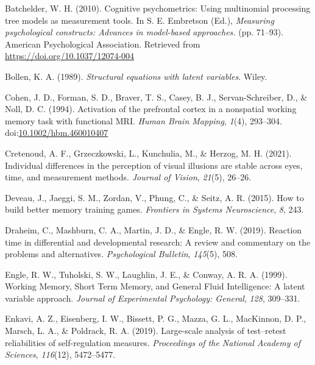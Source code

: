 \documentclass[
  ,man]{apa6}
\newlength{\cslhangindent}
\newlength{\cslentryspacingunit} %
\newenvironment{CSLReferences}[2] %
 {%
  \setlength{\parindent}{0pt}
  \ifodd #1
  \let\oldpar\par
  \def\par{\hangindent=\cslhangindent\oldpar}
  \fi
  \setlength{\parskip}{#2\cslentryspacingunit}
 }%
 {}
\begin{document}
\hypertarget{refs}{}
\begin{CSLReferences}{1}{0}
\leavevmode{}%
Batchelder, W. H. (2010). Cognitive psychometrics: {Using} multinomial processing tree models as measurement tools. In S. E. Embretson (Ed.), \emph{Measuring psychological constructs: {Advances} in model-based approaches.} (pp. 71--93). {American Psychological Association}. Retrieved from \url{https://doi.org/10.1037/12074-004}

\leavevmode{}%
Bollen, K. A. (1989). \emph{Structural equations with latent variables}. {Wiley}.

\leavevmode{}%
Cohen, J. D., Forman, S. D., Braver, T. S., Casey, B. J., Servan-Schreiber, D., \& Noll, D. C. (1994). Activation of the prefrontal cortex in a nonspatial working memory task with functional {MRI}. \emph{Human Brain Mapping}, \emph{1}(4), 293--304. doi:\href{https://doi.org/10.1002/hbm.460010407}{10.1002/hbm.460010407}

\leavevmode{}%
Cretenoud, A. F., Grzeczkowski, L., Kunchulia, M., \& Herzog, M. H. (2021). Individual differences in the perception of visual illusions are stable across eyes, time, and measurement methods. \emph{Journal of Vision}, \emph{21}(5), 26--26.

\leavevmode{}%
Deveau, J., Jaeggi, S. M., Zordan, V., Phung, C., \& Seitz, A. R. (2015). How to build better memory training games. \emph{Frontiers in Systems Neuroscience}, \emph{8}, 243.

\leavevmode{}%
Draheim, C., Mashburn, C. A., Martin, J. D., \& Engle, R. W. (2019). Reaction time in differential and developmental research: {A} review and commentary on the problems and alternatives. \emph{Psychological Bulletin}, \emph{145}(5), 508.

\leavevmode{}%
Engle, R. W., Tuholski, S. W., Laughlin, J. E., \& Conway, A. R. A. (1999). Working {Memory}, {Short Term Memory}, and {General Fluid Intelligence}: {A} latent variable approach. \emph{Journal of Experimental Psychology: General}, \emph{128}, 309--331.

\leavevmode{}%
Enkavi, A. Z., Eisenberg, I. W., Bissett, P. G., Mazza, G. L., MacKinnon, D. P., Marsch, L. A., \& Poldrack, R. A. (2019). Large-scale analysis of test--retest reliabilities of self-regulation measures. \emph{Proceedings of the National Academy of Sciences}, \emph{116}(12), 5472--5477.


\end{CSLReferences}
\end{document}
